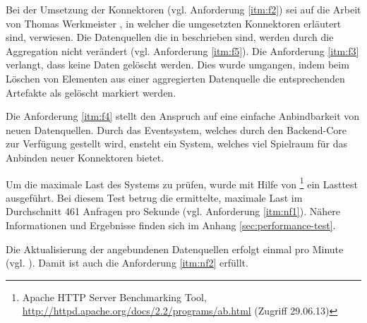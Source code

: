 Bei der Umsetzung der \gls{Konnektor}en (vgl. Anforderung \ref{itm:f2}) sei auf die Arbeit von Thomas Werkmeister \cite{bp-tewe}, in welcher die umgesetzten \gls{Konnektor}en erläutert sind, verwiesen. Die Datenquellen die in \cite{bp-tewe} beschrieben sind, werden durch die Aggregation nicht verändert (vgl. Anforderung \ref{itm:f5}). Die Anforderung \ref{itm:f3} verlangt, dass keine Daten gelöscht werden. Dies wurde umgangen, indem beim Löschen von Elementen aus einer aggregierten Datenquelle die entsprechenden \gls{Artefakt}e als gelöscht markiert werden.

Die Anforderung \ref{itm:f4} stellt den Anspruch auf eine einfache Anbindbarkeit von neuen Datenquellen. Durch das \gls{Eventsystem}, welches durch den \gls{Backend}-Core zur Verfügung gestellt wird, ensteht ein System, welches viel Spielraum für das Anbinden neuer \gls{Konnektor}en bietet.

Um die maximale Last des Systems zu prüfen, wurde mit Hilfe von \footnote{Apache HTTP Server Benchmarking Tool, \url{http://httpd.apache.org/docs/2.2/programs/ab.html} (Zugriff 29.06.13)} ein Lasttest ausgeführt. Bei diesem Test betrug die ermittelte, maximale Last im Durchschnitt 461 Anfragen pro Sekunde (vgl. Anforderung \ref{itm:nf1}). Nähere Informationen und Ergebnisse finden sich im Anhang \ref{sec:performance-test}.

Die Aktualisierung der angebundenen Datenquellen erfolgt einmal pro Minute (vgl. \cite{bp-tewe}). Damit ist auch die Anforderung \ref{itm:nf2} erfüllt.